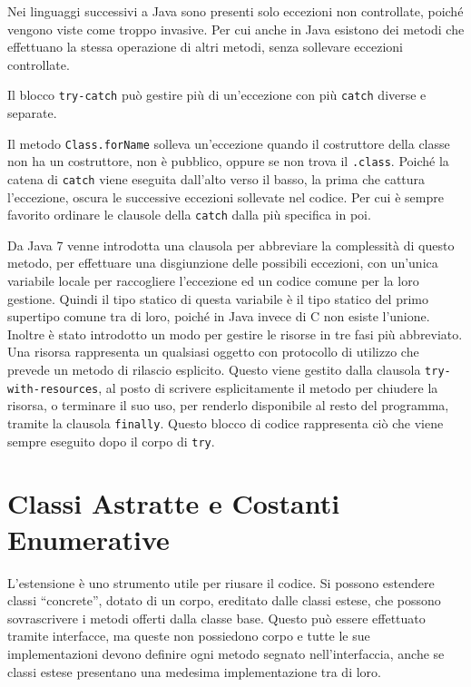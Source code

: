 \documentclass{article}
\numberwithin{equation}{subsection}
\begin{document}
Nei linguaggi successivi a Java sono presenti solo eccezioni non controllate, poiché vengono viste come troppo invasive. Per cui anche in Java esistono dei metodi che 
effettuano la stessa operazione di altri metodi, senza sollevare eccezioni controllate. 

Il blocco \verb|try-catch| può gestire più di un'eccezione con più \verb|catch| diverse e separate. 

Il metodo \verb|Class.forName| solleva un'eccezione quando il costruttore della classe non ha un costruttore, non è pubblico, oppure se non trova il \verb|.class|. 
Poiché la catena di \verb|catch| viene eseguita dall'alto verso il basso, la prima che cattura l'eccezione, oscura le successive eccezioni sollevate nel codice. 
Per cui è sempre favorito ordinare le clausole della \verb|catch| dalla più specifica in poi. 


Da Java 7 venne introdotta una clausola per abbreviare la complessità di questo  
metodo, per effettuare una disgiunzione delle possibili eccezioni, con un'unica variabile locale per raccogliere l'eccezione ed un codice comune per la loro gestione. 
Quindi il tipo statico di questa variabile è il tipo statico del primo supertipo comune tra di loro, poiché in Java invece di C non esiste l'unione. 
Inoltre è stato introdotto un modo per gestire le risorse in tre fasi più abbreviato. Una risorsa rappresenta un qualsiasi oggetto con protocollo di utilizzo che prevede 
un metodo di rilascio esplicito. Questo viene gestito dalla clausola \verb|try-with-resources|, al posto di scrivere esplicitamente il metodo per chiudere la risorsa, o 
terminare il suo uso, per renderlo disponibile al resto del programma, tramite la clausola \verb|finally|. 
Questo blocco di codice rappresenta ciò che viene sempre eseguito dopo il corpo di \verb|try|. 


\clearpage

\section{Classi Astratte e Costanti Enumerative}

L'estensione è uno strumento utile per riusare il codice. Si possono estendere classi ``concrete'', dotato di un corpo, ereditato dalle 
classi estese, che possono sovrascrivere i metodi offerti dalla classe base. 
Questo può essere effettuato tramite interfacce, ma queste non possiedono corpo e tutte le sue implementazioni devono definire ogni metodo segnato nell'interfaccia, anche 
se classi estese presentano una medesima implementazione tra di loro. 
\end{document}
